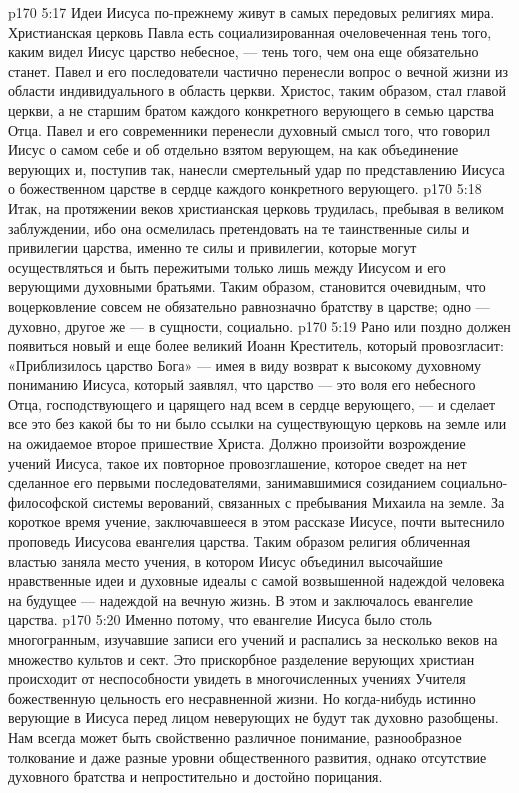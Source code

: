 \vs p170 5:17 Идеи Иисуса по\hyp{}прежнему живут в самых передовых религиях мира. Христианская церковь Павла есть социализированная очеловеченная тень того, каким видел Иисус царство небесное, --- тень того, чем она еще обязательно станет. Павел и его последователи частично перенесли вопрос о вечной жизни из области индивидуального в область церкви. Христос, таким образом, стал главой церкви, а не старшим братом каждого конкретного верующего в семью царства Отца. Павел и его современники перенесли духовный смысл того, что говорил Иисус о самом себе и об отдельно взятом верующем, на  как объединение верующих и, поступив так, нанесли смертельный удар по представлению Иисуса о божественном царстве в сердце каждого конкретного верующего.
\vs p170 5:18 Итак, на протяжении веков христианская церковь трудилась, пребывая в великом заблуждении, ибо она осмелилась претендовать на те таинственные силы и привилегии царства, именно те силы и привилегии, которые могут осуществляться и быть пережитыми только лишь между Иисусом и его верующими духовными братьями. Таким образом, становится очевидным, что воцерковление совсем не обязательно равнозначно братству в царстве; одно --- духовно, другое же --- в сущности, социально.
\vs p170 5:19 Рано или поздно должен появиться новый и еще более великий Иоанн Креститель, который провозгласит: «Приблизилось царство Бога» --- имея в виду возврат к высокому духовному пониманию Иисуса, который заявлял, что царство --- это воля его небесного Отца, господствующего и царящего над всем в сердце верующего, --- и сделает все это без какой бы то ни было ссылки на существующую церковь на земле или на ожидаемое второе пришествие Христа. Должно произойти возрождение  учений Иисуса, такое их повторное провозглашение, которое сведет на нет сделанное его первыми последователями, занимавшимися созиданием социально\hyp{}философской системы верований, связанных с  пребывания Михаила на земле. За короткое время учение, заключавшееся в этом рассказе  Иисусе, почти вытеснило проповедь Иисусова евангелия царства. Таким образом религия обличенная властью заняла место учения, в котором Иисус объединил высочайшие нравственные идеи и духовные идеалы с самой возвышенной надеждой человека на будущее --- надеждой на вечную жизнь. В этом и заключалось евангелие царства.
\vs p170 5:20 Именно потому, что евангелие Иисуса было столь многогранным, изучавшие записи его учений и распались за несколько веков на множество культов и сект. Это прискорбное разделение верующих христиан происходит от неспособности увидеть в многочисленных учениях Учителя божественную цельность его несравненной жизни. Но когда\hyp{}нибудь истинно верующие в Иисуса перед лицом неверующих не будут так духовно разобщены. Нам всегда может быть свойственно различное понимание, разнообразное толкование и даже разные уровни общественного развития, однако отсутствие духовного братства и непростительно и достойно порицания.
